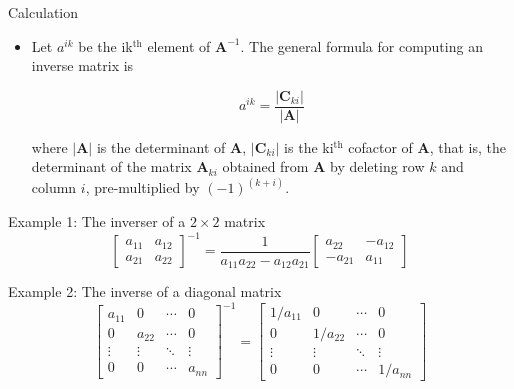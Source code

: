 \documentclass[presentation]{beamer}
\begin{document}
\begin{frame}[label={sec:org6ddd9e5}]{Calculation}
\begin{itemize}
\item Let \(a^{ik}\) be the ik\(^{\text{th}}\) element of \(\mathbf{A}^{-1}\). The general
formula for computing an inverse matrix is 

\[ a^{ik} =
  \frac{|\mathbf{C}_{ki}|}{|\mathbf{A}|} \] 

where \(| \mathbf{A} |\) is the determinant of \(\mathbf{A}\), \(|
  \mathbf{C}_{ki} |\) is the ki\(^{\text{th}}\) cofactor of \(\mathbf{A}\), that is,
the determinant of the matrix \(\mathbf{A}_{ki}\) obtained from
\(\mathbf{A}\) by deleting row \(k\) and column \(i\), pre-multiplied by
\((-1)^{(k + i)}\).
\end{itemize}
\end{frame}

\begin{frame}[label={sec:org2bed28a}]{Example 1: The inverser of a \(2 \times 2\) matrix}
\begin{equation*}
 \begin{bmatrix}
  a_{11} & a_{12} \\ 
  a_{21} & a_{22}
  \end{bmatrix}^{-1}
 =\frac{1}{a_{11}a_{22} - a_{12}a_{21}}
 \begin{bmatrix}
  a_{22} & -a_{12} \\ 
  -a_{21} & a_{11}
  \end{bmatrix}
\end{equation*}
\end{frame}

\begin{frame}[label={sec:orga347053}]{Example 2: The inverse of a diagonal matrix}
\begin{equation*}  
\begin{bmatrix}
a_{11} & 0 & \cdots & 0 \\
0 & a_{22} & \cdots & 0 \\
\vdots & \vdots & \ddots & \vdots \\
0 & 0 & \cdots & a_{nn}
\end{bmatrix}^{-1}
=
\begin{bmatrix}
1/a_{11} & 0 & \cdots & 0 \\
0 & 1/a_{22} & \cdots & 0 \\
\vdots & \vdots & \ddots & \vdots \\
0 & 0 & \cdots & 1/a_{nn}
\end{bmatrix}
\end{equation*}
\end{frame}
\end{document}
